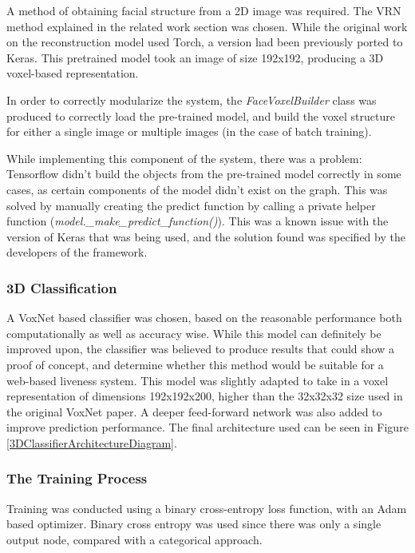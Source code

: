 \documentclass[12pt,a4paper]{article}
\begin{document}
            A method of obtaining facial structure from a 2D image was required. The VRN method explained in the related work section was chosen. \cite{3DReconstructionMethod}
            While the original work on the reconstruction model used Torch, a version had been previously ported to Keras.\cite{VRNTorchToKeras} This pretrained model took an image of size 192x192, producing a 3D voxel-based representation. 

            In order to correctly modularize the system, the \emph{FaceVoxelBuilder} class was produced to correctly load the pre-trained model, and build the voxel structure for either a single image or multiple images (in the case of batch training).

            While implementing this component of the system, there was a problem: Tensorflow didn't build the objects from the pre-trained model correctly in some cases, as certain components of the model didn't exist on the graph. This was solved by manually creating the predict function by calling a private helper function (\emph{model.\_make\_predict\_function()}).
            This was a known issue with the version of Keras that was being used, and the solution found was specified by the developers of the framework. \cite{KerasVoxNetBug}

        \subsubsection{3D Classification}
            A VoxNet based classifier was chosen, based on the reasonable performance both computationally as well as accuracy wise. 
            While this model can definitely be improved upon, the classifier was believed to produce results that could show a proof of concept,
            and determine whether this method would be suitable for a web-based liveness system. This model was slightly adapted to
            take in a voxel representation of dimensions 192x192x200, higher than the 32x32x32 size used in the original VoxNet paper.
            A deeper feed-forward network was also added to improve prediction performance.
            The final architecture used can be seen in Figure \ref{3DClassifierArchitectureDiagram}.

         

        \subsubsection{The Training Process}
            Training was conducted using a binary cross-entropy loss function, with an Adam based optimizer. Binary cross entropy was used since there was only a single output node,
            compared with a categorical approach. 
\end{document}
